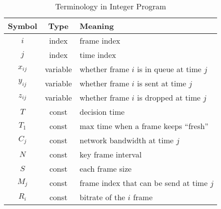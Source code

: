 \begin{table}[tb]
\centering
\caption{Terminology in Integer Program}
\label{tbl:term}
{\setlength{\tabcolsep}{1pt}
\begin{tabular}{|c|c|l|}
\hline
\textbf{Symbol} & \textbf{Type} & \textbf{Meaning}                      \\ \hline
$i$               & index         & frame index                           \\ \hline
$j$               & index         & time index                            \\ \hline
$x_{ij}$             & variable      & whether frame $i$ is in queue at time $j$ \\ \hline
$y_{ij}$             & variable      & whether frame $i$ is sent at time $j$     \\ \hline
$z_{ij}$             & variable      & whether frame $i$ is dropped at time $j$  \\ \hline
$T$               & const         & decision time                        \\ \hline
$T_1$             & const       & max time when a frame keeps ``fresh'' \\ \hline
$C_j$              & const         & network bandwidth at time $j$           \\ \hline
$N$               & const         & key frame interval                      \\ \hline
$S$            & const         & each frame size                        \\ \hline
$M_{j}$       & const         & frame index that can be send at time $j$ \\ \hline
$R_{i}$        & const         & bitrate of the $i$ frame               \\ \hline
\end{tabular}}
\end{table}
